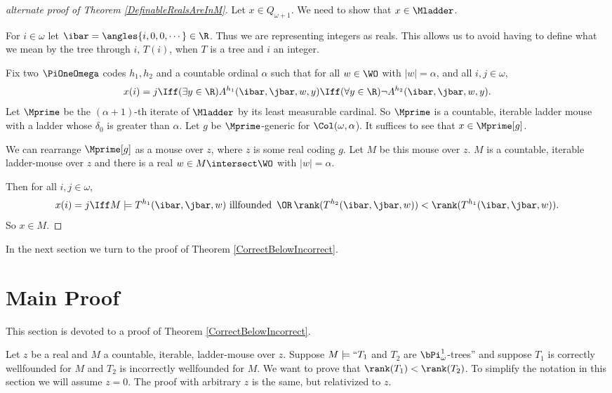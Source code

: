 \documentclass[oneside,12pt]{amsart}
\begin{document}
\begin{proof}[alternate proof of Theorem \ref{DefinableRealsAreInM}]
Let $x\in Q_{\omega+1}$. We need to show that $x\in\Mladder$.

For $i\in\omega$ let $\ibar=\angles{i,0,0,\cdots}\in\R$. Thus we are representing integers as reals.
This allows us to avoid having to define what we mean by the tree through $i$, $T(i)$, when $T$ is a tree and $i$ an integer.


Fix two $\PiOneOmega$ codes $h_1,h_2$ and a countable ordinal $\alpha$ such that for
all $w\in\WO$ with $|w|=\alpha$, and all $i,j\in\omega$,
$$x(i)=j \Iff (\exists y\in\R)A^{h_1}(\ibar,\jbar,w,y) \Iff (\forall y\in\R)\neg A^{h_2}(\ibar,\jbar,w,y).$$
Let $\Mprime$ be the $(\alpha+1)$-th iterate of $\Mladder$ by its least
measurable cardinal. So $\Mprime$ is a countable, iterable ladder mouse with
a ladder whose $\delta_0$ is greater than $\alpha$. Let $g$ be $\Mprime$-generic
for $\Col(\omega,\alpha$). It suffices to see that $x\in\Mprime[g]$.

We can rearrange $\Mprime[g]$ as a mouse over $z$, where $z$ is some real coding $g$.
Let $M$ be this mouse over $z$. $M$ is a countable, iterable ladder-mouse over $z$ and there
is a real $w\in M\intersect\WO$ with $|w|=\alpha$.

Then for all
$i,j\in\omega$,
$$x(i)=j \Iff  M \models T^{h_1}(\ibar,\jbar,w) \text{ illfounded } \,\OR\, \rank(T^{h_2}(\ibar,\jbar,w)) < \rank(T^{h_1}(\ibar,\jbar,w)).$$
So $x\in M$.

\end{proof}

In the next section we turn to the proof of Theorem \ref{CorrectBelowIncorrect}.


\section{Main Proof}
\label{section:mainproof}

This section is devoted to a proof of Theorem \ref{CorrectBelowIncorrect}.

Let $z$ be a real and $M$ a countable, iterable, ladder-mouse over $z$.
Suppose $M\models ``T_1$ and $T_2$ are $\bPi^1_{\omega}$-trees'' and
suppose $T_1$ is correctly wellfounded for $M$ and
$T_2$ is incorrectly wellfounded for $M$. We want to prove that
$\rank(T_1) < \rank(T_2)$. To simplify the notation in this section we will
assume $z=0$. The proof
with arbitrary $z$ is the same, but relativized to $z$.
\end{document}
